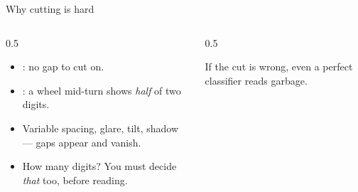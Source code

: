 \documentclass[10pt,aspectratio=169]{beamer}
\begin{document}
\begin{frame}{Why cutting is hard}
  \begin{columns}[T]
    \begin{column}{0.5\textwidth}
      \begin{itemize}
        \item {}: no gap to cut on.
        \item {}: a wheel mid-turn shows \emph{half} of two digits.
        \item Variable spacing, glare, tilt, shadow --- gaps appear and vanish.
        \item How many digits? You must decide \emph{that} too, before reading.
      \end{itemize}
    \end{column}
    \begin{column}{0.5\textwidth}
      \begin{center}
      \end{center}
      \begin{badbox}
        If the cut is wrong, even a perfect classifier reads garbage.
      \end{badbox}
    \end{column}
  \end{columns}
\end{frame}
\end{document}
